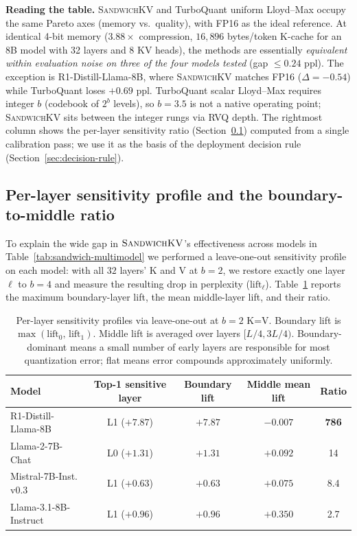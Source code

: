 \documentclass[11pt]{article}
\theoremstyle{definition}
\newcommand{\eq}{\textsc{SandwichKV}}
\begin{document}
\textbf{Reading the table.} \eq{} and TurboQuant uniform Lloyd--Max occupy the same Pareto axes (memory vs.\ quality), with FP16 as the ideal reference. At identical 4-bit memory ($3.88\times$ compression, $16{,}896$ bytes/token K-cache for an 8B model with 32 layers and 8 KV heads), the methods are essentially \emph{equivalent within evaluation noise on three of the four models tested} (gap $\le 0.24$ ppl). The exception is R1-Distill-Llama-8B, where \eq{} matches FP16 (\textbf{$\Delta = -0.54$}) while TurboQuant loses $+0.69$ ppl. TurboQuant scalar Lloyd--Max requires integer $b$ (codebook of $2^b$ levels), so $b{=}3.5$ is not a native operating point; \eq{} sits between the integer rungs via RVQ depth. The rightmost column shows the per-layer sensitivity ratio (Section~\ref{sec:profile}) computed from a single calibration pass; we use it as the basis of the deployment decision rule (Section~\ref{sec:decision-rule}).

\subsection{Per-layer sensitivity profile and the boundary-to-middle ratio}
\label{sec:profile}

To explain the wide gap in $\eq{}$'s effectiveness across models in Table~\ref{tab:sandwich-multimodel} we performed a leave-one-out sensitivity profile on each model: with all $32$ layers' K and V at $b{=}2$, we restore exactly one layer~$\ell$ to $b{=}4$ and measure the resulting drop in perplexity ($\text{lift}_\ell$). Table~\ref{tab:sensitivity} reports the maximum boundary-layer lift, the mean middle-layer lift, and their ratio.

\begin{table}[t]
\centering
\caption{Per-layer sensitivity profiles via leave-one-out at $b{=}2$ K=V. Boundary lift is $\max(\text{lift}_0,\,\text{lift}_1)$. Middle lift is averaged over layers $[L/4, 3L/4)$. Boundary-dominant means a small number of early layers are responsible for most quantization error; flat means error compounds approximately uniformly.}
\label{tab:sensitivity}
\begin{tabular}{lcccc}
\toprule
\textbf{Model} & Top-1 sensitive layer & Boundary lift & Middle mean lift & Ratio \\
\midrule
R1-Distill-Llama-8B  & L1 ($+7.87$)  & $+7.87$ & $-0.007$ & \textbf{786} \\
Llama-2-7B-Chat      & L0 ($+1.31$)  & $+1.31$ & $+0.092$ & 14    \\
Mistral-7B-Inst.\,v0.3 & L1 ($+0.63$)  & $+0.63$ & $+0.075$ &   8.4 \\
Llama-3.1-8B-Instruct & L1 ($+0.96$)  & $+0.96$ & $+0.350$ &   2.7 \\
\bottomrule
\end{tabular}
\end{table}
\end{document}
